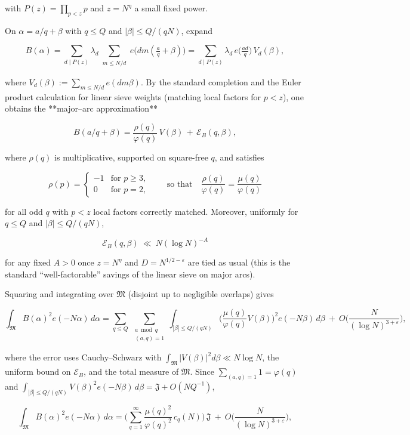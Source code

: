 \documentclass[11pt]{article}
\theoremstyle{definition}
\theoremstyle{remark}
\begin{document}
with $P(z)=\prod_{p<z}p$ and $z=N^{\eta}$ a small fixed power.

On $\alpha=a/q+\beta$ with $q\le Q$ and $|\beta|\le Q/(qN)$, expand

$$
B(\alpha)=\sum_{d\mid P(z)}\lambda_d
\sum_{\substack{m\le N/d}} e\!\big(dm(\tfrac aq+\beta)\big)
=\sum_{d\mid P(z)}\lambda_d\, e\!\big(\tfrac{ad}{q}\big)\,V_d(\beta),
$$

where $V_d(\beta):=\sum_{m\le N/d}e(dm\beta)$. By the standard completion and the Euler product calculation for linear sieve weights (matching local factors for $p<z$), one obtains the **major–arc approximation**

$$
B(a/q+\beta)=\frac{\rho(q)}{\varphi(q)}\,V(\beta)\,+\,\mathcal E_B(q,\beta),
$$

where $\rho(q)$ is multiplicative, supported on square-free $q$, and satisfies

$$
\rho(p)=
\begin{cases}
-1& \text{for } p\ge 3,\\
0 & \text{for } p=2,
\end{cases}
\qquad\text{so that}\quad \frac{\rho(q)}{\varphi(q)}=\frac{\mu(q)}{\varphi(q)}
$$

for all odd $q$ with $p<z$ local factors correctly matched. Moreover, uniformly for $q\le Q$ and $|\beta|\le Q/(qN)$,

$$
\mathcal E_B(q,\beta)\ \ll\ N(\log N)^{-A}
$$

for any fixed $A>0$ once $z=N^\eta$ and $D=N^{1/2-\varepsilon}$ are tied as usual (this is the standard “well-factorable” savings of the linear sieve on major arcs).

Squaring and integrating over $\mathfrak M$ (disjoint up to negligible overlaps) gives

$$
\int_{\mathfrak M} B(\alpha)^2 e(-N\alpha)\,d\alpha
= \sum_{q\le Q}\ \sum_{\substack{a\bmod q\\(a,q)=1}}
\int_{|\beta|\le Q/(qN)} 
\Big(\frac{\mu(q)}{\varphi(q)}V(\beta)\Big)^{\!2} e(-N\beta)\,d\beta
\ +\ O\!\Big(\frac{N}{(\log N)^{3+\varepsilon}}\Big),
$$

where the error uses Cauchy–Schwarz with $\int_{\mathfrak M}|V(\beta)|^2 d\beta\ll N\log N$, the uniform bound on $\mathcal E_B$, and the total measure of $\mathfrak M$.
Since $\sum_{(a,q)=1}1=\varphi(q)$ and $\int_{|\beta|\le Q/(qN)}V(\beta)^2 e(-N\beta)\,d\beta=\mathfrak J+O(NQ^{-1})$,

$$
\int_{\mathfrak M} B(\alpha)^2 e(-N\alpha)\,d\alpha
= \Big(\sum_{q=1}^{\infty}\frac{\mu(q)^2}{\varphi(q)^2}\,c_q(N)\Big)\,\mathfrak J
\ +\ O\!\Big(\frac{N}{(\log N)^{3+\varepsilon}}\Big),
$$
\end{document}

